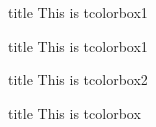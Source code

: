 \begin{frame}
  \begin{tcolorbox1}{title}
    This is tcolorbox1
  \end{tcolorbox1}
  \begin{tcolorbox1}[2]{title}
    This is tcolorbox1
  \end{tcolorbox1}
  \begin{tcolorbox2}{title}
    This is tcolorbox2
  \end{tcolorbox2}
  \begin{tcolorbox}{title}
    This is tcolorbox
  \end{tcolorbox}
\end{frame}
